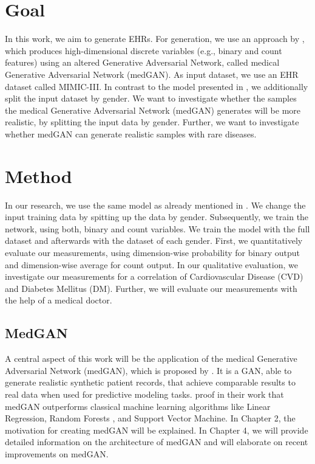 \documentclass[11pt, a4paper, oneside]{book}
\begin{document}
\section{Goal}
In this work, we aim to generate EHRs. For generation, we use an approach by \citep{Choi2017}, which produces high-dimensional discrete variables (e.g., binary and count features) using an altered Generative Adversarial Network, called medical Generative Adversarial Network (medGAN). As input dataset, we use an EHR dataset called MIMIC-III. In contrast to the model presented in \citep{Choi2017}, we additionally split the input dataset by gender.
 We want to investigate whether the samples the medical Generative Adversarial Network (medGAN) generates will be more realistic, by splitting the input data by gender. Further, we want to investigate whether medGAN can generate realistic samples with rare diseases.
 
\section{Method}
In our research, we use the same model as already mentioned in \citep{Choi2017}. We change the input training data by spitting up the data by gender. Subsequently, we train the network, using both, binary and count variables. We train the model with the full dataset and afterwards with the dataset of each gender. First, we quantitatively evaluate our measurements, using dimension-wise probability for binary output and dimension-wise average for count output. In our qualitative evaluation, we investigate our measurements for a correlation of Cardiovascular Disease (CVD) and Diabetes Mellitus (DM). Further, we will evaluate our measurements with the help of a medical doctor.

\subsection{MedGAN}
A central aspect of this work will be the application of the medical Generative Adversarial Network (medGAN), which is proposed by \citep{Choi2017}.
It is a GAN, able to generate realistic synthetic patient records, that achieve comparable results to real data when used for predictive modeling tasks. \citep{Choi2017} proof in their work that medGAN outperforms classical machine learning algorithms like Linear Regression, Random Forests , and Support Vector Machine. 
In Chapter 2, the motivation for creating medGAN will be explained. In Chapter 4, we will provide detailed information on the architecture of medGAN and will elaborate on recent improvements on medGAN.
\end{document}
